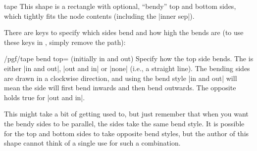 \begin{shape}{tape}
	This shape is a rectangle with optional, ``bendy'' top and bottom
	sides, which tightly fits the node contents (including the 
	|inner sep|).
	
\begin{codeexample}[]
\end{codeexample}

  There are \pgfname{} keys to specify which sides bend and how high
  the bends are (to use these keys in \tikzname{}, simply remove the
   path):
  
  \begin{key}{/pgf/tape bend top= (initially in and out)}
  	Specify how the top side bends. The  is either
  	|in and out|, |out and in| or |none| (i.e., a straight line). 
  	The bending sides are drawn in a 
  	clockwise direction, and using the bend style |in and out| will mean 
  	the side will first	bend inwards and then bend outwards. 
  	The opposite holds true for	|out and in|. 
  	
\begin{codeexample}[]
\end{codeexample}  

    This might take a bit of getting used to, but just remember that 
    when you want the bendy sides to be parallel, the sides take the 
    same bend style. It is possible for the top and bottom sides to 
    take opposite bend styles, but the author of this shape cannot 
    think of a single use for such a combination.
    
\begin{codeexample}[]
\end{codeexample} 


\end{key}
\end{shape}
